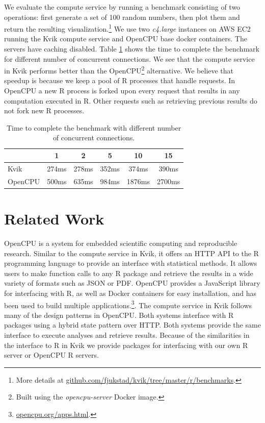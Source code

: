 We evaluate the compute service by running a benchmark consisting of two
operations: first generate a set of 100 random numbers, then plot them and
return the resulting visualization.\footnote{More details at
\url{github.com/fjukstad/kvik/tree/master/r/benchmarks}.} We use two
\emph{c4.large} instances on AWS EC2 running the Kvik compute service and
OpenCPU base docker containers. The servers have caching disabled.  
Table \ref{kvikopencpucomparison} shows the time to complete the benchmark for
different number of concurrent connections. We see that the compute service in
Kvik performs better than the OpenCPU\footnote{Built using the
\textit{opencpu-server} Docker image.} alternative. We believe that speedup is
because we keep a pool of R processes that handle requests. In OpenCPU a new R
process is forked upon every request that results in any computation executed in
R. Other requests such as retrieving previous results do not fork new R
processes. 

\begin{table}[h]
    \caption[]{Time to complete the benchmark with different number of
    concurrent connections.}
    \begin{tabular}{| l | c | c | c | c | c | }
        \hline 
       & 1 & 2 & 5 & 10 & 15 \\ 
      \hline			
      Kvik & 274ms & 278ms & 352ms & 374ms & 390ms\\
      \hline
      OpenCPU & 500ms & 635ms & 984ms & 1876ms & 2700ms\\
      \hline  
    \end{tabular}
\label{kvikopencpucomparison}
\end{table} 


\section{Related Work} 

OpenCPU is a system for embedded scientific computing and reproducible
research.\cite{opencpu} Similar to the compute service in Kvik, it offers an
HTTP API to the R programming language to provide an interface with statistical
methods. It allows users to make function calls to any R package and retrieve
the results in a wide variety of formats such as JSON or PDF. 
OpenCPU provides a JavaScript library for interfacing with R, as well as Docker
containers for easy installation, and has been used to build multiple
applications.\footnote{\url{opencpu.org/apps.html}.}. The compute service in
Kvik follows many of the design patterns in OpenCPU. Both systems interface with
R packages using a hybrid state pattern over HTTP. Both systems provide the same
interface to execute analyses and retrieve results.  Because of the similarities
in the interface to R in Kvik we provide packages for interfacing with our own R
server or OpenCPU R servers.

